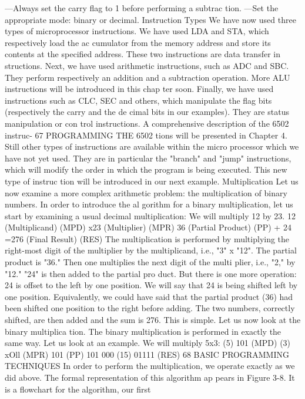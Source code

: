 —Always set the carry flag to 1 before performing a subtrac
tion.
—Set the appropriate mode: binary or decimal.
Instruction Types
We have now used three types of microprocessor instructions.
We have used LDA and STA, which respectively load the ac
cumulator from the memory address and store its contents at the
specified address. These two instructions are data transfer in
structions.
Next, we have used arithmetic instructions, such as ADC and
SBC. They perform respectively an addition and a subtraction
operation. More ALU instructions will be introduced in this chap
ter soon.
Finally, we have used instructions such as CLC, SEC and others,
which manipulate the flag bits (respectively the carry and the de
cimal bits in our examples). They are status manipulation or con
trol instructions. A comprehensive description of the 6502 instruc-
67
PROGRAMMING THE 6502
tions will be presented in Chapter 4.
Still other types of instructions are available within the micro
processor which we have not yet used. They are in particular
the "branch" and "jump" instructions, which will modify the order
in which the program is being executed. This new type of instruc
tion will be introduced in our next example.
Multiplication
Let us now examine a more complex arithmetic problem: the
multiplication of binary numbers. In order to introduce the al
gorithm for a binary multiplication, let us start by examining a
usual decimal multiplication: We will multiply 12 by 23.
12 (Multiplicand) (MPD)
x23 (Multiplier) (MPR)
36 (Partial Product) (PP)
+ 24
=276 (Final Result) (RES)
The multiplication is performed by multiplying the right-most digit
of the multiplier by the multiplicand, i.e., "3" x "12". The partial
product is "36." Then one multiplies the next digit of the multi
plier, i.e., "2," by "12." "24" is then added to the partial pro
duct.
But there is one more operation: 24 is offset to the left by one
position. We will say that 24 is being shifted left by one position.
Equivalently, we could have said that the partial product (36) had
been shifted one position to the right before adding.
The two numbers, correctly shifted, are then added and the sum
is 276. This is simple. Let us now look at the binary multiplica
tion. The binary multiplication is performed in exactly the same
way.
Let us look at an example. We will multiply 5x3:
(5) 101 (MPD)
(3) xOll (MPR)
101 (PP)
101
000
(15) 01111 (RES)
68
BASIC PROGRAMMING TECHNIQUES
In order to perform the multiplication, we operate exactly as
we did above. The formal representation of this algorithm ap
pears in Figure 3-8. It is a flowchart for the algorithm, our first
